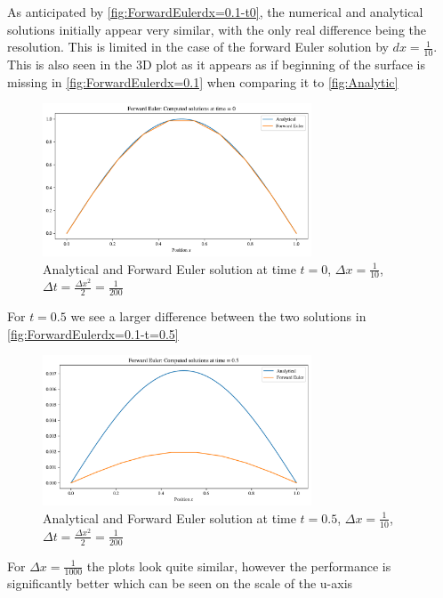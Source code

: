 \documentclass{article}
\theoremstyle{definition}
\begin{document}
As anticipated by \autoref{fig:ForwardEulerdx=0.1-t0}, the numerical and analytical solutions initially appear very similar, with the only real difference being the resolution. This is limited in the case of the forward Euler solution by $dx = \frac{1}{10}$. This is also seen in the 3D plot as it appears as if beginning of the surface is missing in \autoref{fig:ForwardEulerdx=0.1} when comparing it to \autoref{fig:Analytic}
\begin{figure}[H]%
    \centering
    \includegraphics[width=8cm]{Project3/figures/1dHeat/difference_surf_dx_0.1_timestep_0.0.pdf}
    \caption{Analytical and Forward Euler solution at time $t=0$, $\Delta x = \frac{1}{10}$, $\Delta t = \frac{\Delta x^2}{2} = \frac{1}{200} $}
    \label{fig:ForwardEulerdx=0.1-t0}
\end{figure}
For $t=0.5$ we see a larger difference between the two solutions in \autoref{fig:ForwardEulerdx=0.1-t=0.5}
\begin{figure}[H]%
    \centering
    \includegraphics[width=8cm]{Project3/figures/1dHeat/difference_surf_dx_0.1_timestep_0.5.pdf}
    \caption{Analytical and Forward Euler solution at time $t=0.5$, $\Delta x = \frac{1}{10}$, $\Delta t = \frac{\Delta x^2}{2} = \frac{1}{200} $}
    \label{fig:ForwardEulerdx=0.1-t=0.5}
\end{figure}


For $\Delta x = \frac{1}{1000}$ the plots look quite similar, however the performance is significantly better which can be seen on the scale of the u-axis 
\end{document}
